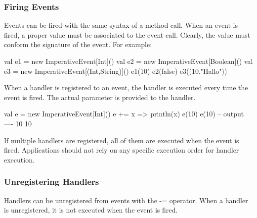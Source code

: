 \documentclass[10pt,a4paper]{article}
\newcommand{\code}[1]{{\fontfamily{cmtt}\small\selectfont#1}}
\begin{document}
\subsubsection{Firing Events}

Events can be fired with the same syntax of a method call. When an
event is fired, a proper value must be associated to the event
call. Clearly, the value must conform the signature of the event. For
example:

\begin{codenv}
val e1 = new ImperativeEvent[Int]()
val e2 = new ImperativeEvent[Boolean]()
val e3 = new ImperativeEvent[(Int,String)]()
e1(10)
e2(false)
e3((10,"Hallo"))
\end{codenv}

When a handler is registered to an event, the handler is executed
every time the event is fired. The actual parameter is provided to the
handler.

\begin{codenv}
val e = new ImperativeEvent[Int]()
e += { x => println(x) }
e(10)
e(10)
-- output ----
10
10
\end{codenv}

If multiple handlers are registered, all of them are executed when the
event is fired. Applications should not rely on any specific execution
order for handler execution.







\subsubsection{Unregistering Handlers}

Handlers can be unregistered from events with the \code{-=}
operator. When a handler is unregistered, it is not executed when the
event is fired.

\end{document}
